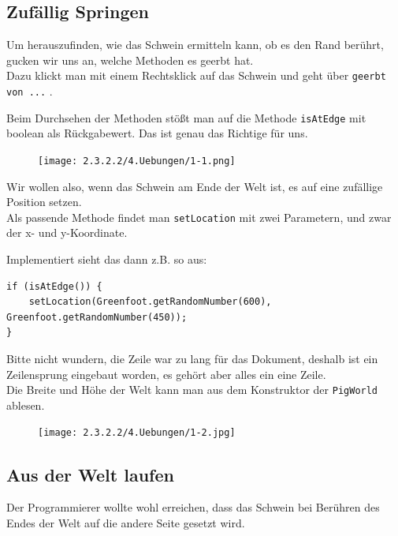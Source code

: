 \documentclass{scrartcl}   %
\begin{document}
\subsection{Zufällig Springen}

Um herauszufinden, wie das Schwein ermitteln kann, ob es den Rand berührt, gucken wir uns an, welche Methoden es geerbt hat.\\
Dazu klickt man mit einem Rechtsklick auf das Schwein und geht über \texttt{geerbt von ...} .

Beim Durchsehen der Methoden stößt man auf die Methode \texttt{isAtEdge} mit boolean als Rückgabewert. Das ist genau das Richtige für uns.\\

\begin{figure}[ht]
	\centering
	\texttt{[image: 2.3.2.2/4.Uebungen/1-1.png]}
\end{figure}

Wir wollen also, wenn das Schwein am Ende der Welt ist, es auf eine zufällige Position setzen.\\
Als passende Methode findet man \texttt{setLocation} mit zwei Parametern, und zwar der x- und y-Koordinate.

\newpage

Implementiert sieht das dann z.B. so aus:\\
\begin{lstlisting}
if (isAtEdge()) {
    setLocation(Greenfoot.getRandomNumber(600), Greenfoot.getRandomNumber(450));
}
\end{lstlisting}

Bitte nicht wundern, die Zeile war zu lang für das Dokument, deshalb ist ein Zeilensprung eingebaut worden, es gehört aber alles ein eine Zeile.\\

Die Breite und Höhe der Welt kann man aus dem Konstruktor der \texttt{PigWorld} ablesen.\\

\begin{figure}[ht]
	\centering
	\texttt{[image: 2.3.2.2/4.Uebungen/1-2.jpg]}
\end{figure}

\subsection{Aus der Welt laufen}

Der Programmierer wollte wohl erreichen, dass das Schwein bei Berühren des Endes der Welt auf die andere Seite gesetzt wird.
\end{document}
